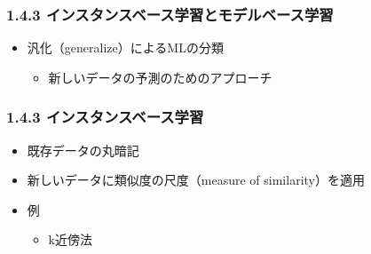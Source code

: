 \documentclass[aspectratio=169, dvipdfmx, 14pt, xcolor={svgnames,dvipsnames}]{beamer}
\def\tightlist{\itemsep1pt\parskip0pt\parsep0pt}
\begin{document}
\begin{frame}
  \frametitle{1.4.3 インスタンスベース学習とモデルベース学習}

  \begin{itemize}
    \tightlist
    \item
          汎化（generalize）によるMLの分類

          \begin{itemize}
            \tightlist
            \item
                  新しいデータの予測のためのアプローチ
          \end{itemize}
  \end{itemize}
\end{frame}


\begin{frame}
  \frametitle{1.4.3 インスタンスベース学習}
  \begin{itemize}
    \tightlist
    \item
          既存データの丸暗記
    \item
          新しいデータに類似度の尺度（measure of similarity）を適用
    \item
          例

          \begin{itemize}
            \tightlist
            \item
                  k近傍法
          \end{itemize}
  \end{itemize}
\end{frame}

\end{document}
